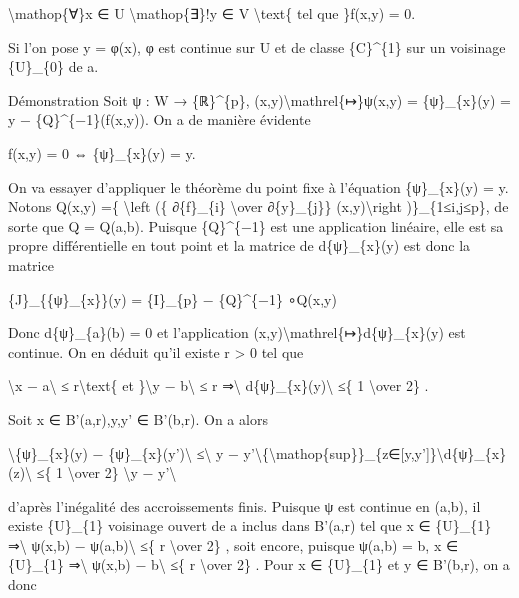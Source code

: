 \documentclass[]{article}
\begin{document}
\textbackslash{}mathop\{∀\}x ∈ U \textbackslash{}mathop\{∃\}!y ∈ V
\textbackslash{}text\{ tel que \}f(x,y) = 0.

Si l'on pose y = φ(x), φ est continue sur U et de classe \{C\}\^{}\{1\}
sur un voisinage \{U\}\_\{0\} de a.

Démonstration Soit ψ : W → \{ℝ\}\^{}\{p\},
(x,y)\textbackslash{}mathrel\{↦\}ψ(x,y) = \{ψ\}\_\{x\}(y) = y −
\{Q\}\^{}\{−1\}(f(x,y)). On a de manière évidente

f(x,y) = 0 ⇔ \{ψ\}\_\{x\}(y) = y.

On va essayer d'appliquer le théorème du point fixe à l'équation
\{ψ\}\_\{x\}(y) = y. Notons Q(x,y) =\{ \textbackslash{}left (\{
∂\{f\}\_\{i\} \textbackslash{}over ∂\{y\}\_\{j\}\}
(x,y)\textbackslash{}right )\}\_\{1≤i,j≤p\}, de sorte que Q = Q(a,b).
Puisque \{Q\}\^{}\{−1\} est une application linéaire, elle est sa propre
différentielle en tout point et la matrice de d\{ψ\}\_\{x\}(y) est donc
la matrice

\{J\}\_\{\{ψ\}\_\{x\}\}(y) = \{I\}\_\{p\} − \{Q\}\^{}\{−1\} ∘Q(x,y)

Donc d\{ψ\}\_\{a\}(b) = 0 et l'application
(x,y)\textbackslash{}mathrel\{↦\}d\{ψ\}\_\{x\}(y) est continue. On en
déduit qu'il existe r \textgreater{} 0 tel que

\textbackslash{}\textbar{}x − a\textbackslash{}\textbar{} ≤
r\textbackslash{}text\{ et \}\textbackslash{}\textbar{}y −
b\textbackslash{}\textbar{} ≤ r ⇒\textbackslash{}\textbar{}
d\{ψ\}\_\{x\}(y)\textbackslash{}\textbar{} ≤\{ 1 \textbackslash{}over
2\} .

Soit x ∈ B'(a,r),y,y' ∈ B'(b,r). On a alors

\textbackslash{}\textbar{}\{ψ\}\_\{x\}(y) −
\{ψ\}\_\{x\}(y')\textbackslash{}\textbar{} ≤\textbackslash{}\textbar{} y
−
y'\textbackslash{}\textbar{}\{\textbackslash{}mathop\{sup\}\}\_\{z∈{[}y,y'{]}\}\textbackslash{}\textbar{}d\{ψ\}\_\{x\}(z)\textbackslash{}\textbar{}
≤\{ 1 \textbackslash{}over 2\} \textbackslash{}\textbar{}y −
y'\textbackslash{}\textbar{}

d'après l'inégalité des accroissements finis. Puisque ψ est continue en
(a,b), il existe \{U\}\_\{1\} voisinage ouvert de a inclus dans B'(a,r)
tel que x ∈ \{U\}\_\{1\} ⇒\textbackslash{}\textbar{} ψ(x,b) −
ψ(a,b)\textbackslash{}\textbar{} ≤\{ r \textbackslash{}over 2\} , soit
encore, puisque ψ(a,b) = b, x ∈ \{U\}\_\{1\} ⇒\textbackslash{}\textbar{}
ψ(x,b) − b\textbackslash{}\textbar{} ≤\{ r \textbackslash{}over 2\} .
Pour x ∈ \{U\}\_\{1\} et y ∈ B'(b,r), on a donc
\end{document}

